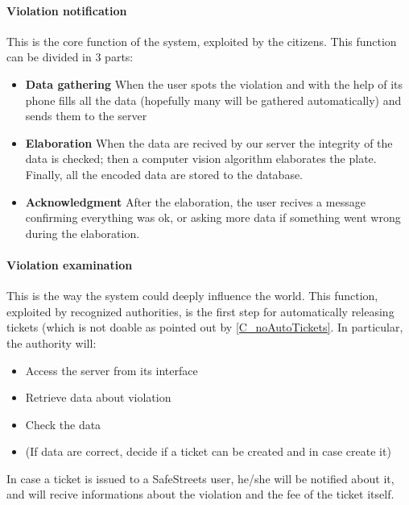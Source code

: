 \documentclass{article}
\begin{document}
		\paragraph{Violation notification}
			This is the core function of the system, exploited by the citizens.
			This function can be divided in 3 parts:
				\begin{itemize}
					\item \textbf{Data gathering}
					When the user spots the violation and with the help of its phone fills all the data (hopefully many will be gathered automatically) and sends them to the server
					\item \textbf{Elaboration}
					When the data are recived by our server the integrity of the data is checked; then a computer vision algorithm elaborates the plate. Finally, all the encoded data are stored to the database.
					\item \textbf{Acknowledgment}
					After the elaboration, the user recives a message confirming everything was ok, or asking more data if something went wrong during the elaboration.
				\end{itemize}
				
		\paragraph{Violation examination}
			This is the way the system could deeply influence the world. This function, exploited by recognized authorities, is the first step for automatically releasing tickets (which is not doable as pointed out by \ref{C_noAutoTickets}. In particular, the authority will:
			\begin{itemize}
				\item Access the server from its interface
				\item Retrieve data about violation
				\item Check the data
				\item (If data are correct, decide if a ticket can be created and in case create it)
			\end{itemize}
			In case a ticket is issued to a SafeStreets user, he/she will be notified about it, and will recive informations about the violation and the fee of the ticket itself.
\end{document}
